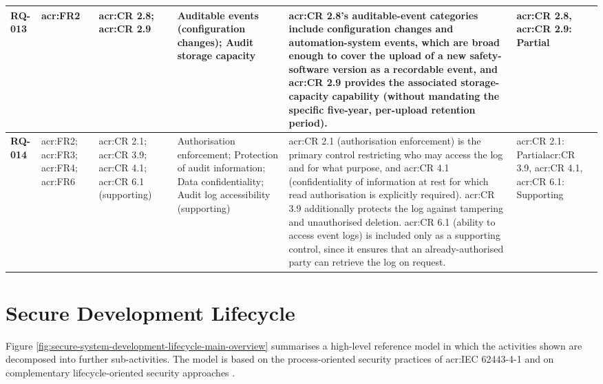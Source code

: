\begin{longtable}{|>{\bfseries}p{1.0cm}|p{0.9cm}|p{2.4cm}|p{2.4cm}|p{4.8cm}|p{1.8cm}|}
	RQ-013 &
	\gls{acr:FR}2 &
	\gls{acr:CR} 2.8; \newline \gls{acr:CR} 2.9 &
	Auditable events (configuration changes); Audit storage capacity &
	\gls{acr:CR} 2.8's auditable-event categories include configuration changes and automation-system events, which are broad enough to cover the upload of a new safety-software version as a recordable event, and \gls{acr:CR} 2.9 provides the associated storage-capacity capability (without mandating the specific five-year, per-upload retention period). &
	\gls{acr:CR} 2.8, \gls{acr:CR} 2.9: Partial \\
	\hline
	
	RQ-014 &
	\gls{acr:FR}2; \gls{acr:FR}3; \gls{acr:FR}4; \gls{acr:FR}6 &
	\gls{acr:CR} 2.1; \newline \gls{acr:CR} 3.9; \newline \gls{acr:CR} 4.1; \newline \gls{acr:CR} 6.1 (supporting) &
	Authorisation enforcement; Protection of audit information; Data confidentiality; Audit log accessibility (supporting) &
	\gls{acr:CR} 2.1 (authorisation enforcement) is the primary control restricting who may access the log and for what purpose, and \gls{acr:CR} 4.1 (confidentiality of information at rest for which read authorisation is explicitly required). \gls{acr:CR} 3.9 additionally protects the log against tampering and unauthorised deletion. \gls{acr:CR} 6.1 (ability to access event logs) is included only as a supporting control, since it ensures that an already-authorised party can retrieve the log on request. &
	\gls{acr:CR} 2.1: Partial\newline \gls{acr:CR} 3.9, \gls{acr:CR} 4.1, \gls{acr:CR} 6.1: Supporting \\
	\hline
	
\end{longtable}
\normalsize

\chapter{Secure Development Lifecycle}
\label{app:SecureDevelopmentLifecycle}


Figure \ref{fig:secure-system-development-lifecycle-main-overview} summarises a high-level reference model in which the activities shown are decomposed into further sub-activities. 
The model is based on the process-oriented security practices of \gls{acr:IEC} 62443-4-1 \cite{DIN_EN_IEC_62443_4_1_2018} and on complementary lifecycle-oriented security approaches \cite{NiemannPuls2023}. 

